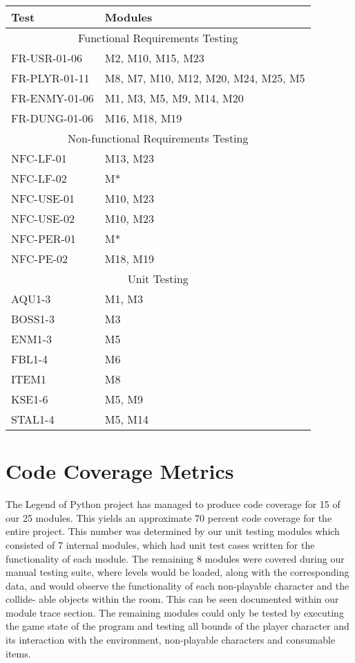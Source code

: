 \documentclass[12pt, titlepage]{article}
\begin{document}
\begin{tabular}{ll}
	\toprule
	Test & Modules \\
	\midrule
	\multicolumn{2}{c}{Functional Requirements Testing} \\
	\midrule
	FR-USR-01-06 & M2, M10, M15, M23 \\
	FR-PLYR-01-11 & M8, M7, M10, M12, M20, M24, M25, M5\\
	FR-ENMY-01-06 & M1, M3, M5, M9, M14, M20\\
	FR-DUNG-01-06 & M16, M18, M19\\
	\midrule
	\multicolumn{2}{c}{Non-functional Requirements Testing} \\
	\midrule
	NFC-LF-01 & M13, M23 \\
	NFC-LF-02 & M* \\
	NFC-USE-01 & M10, M23 \\
	NFC-USE-02 & M10, M23 \\
	NFC-PER-01 & M* \\
	NFC-PE-02 & M18, M19 \\
	\midrule
	\multicolumn{2}{c}{Unit Testing} \\
	\midrule
	AQU1-3 & M1, M3\\
	BOSS1-3 & M3\\ 
	ENM1-3 & M5\\
	FBL1-4 & M6\\
	ITEM1 & M8\\
	KSE1-6 & M5, M9\\
	STAL1-4 & M5, M14\\
	\bottomrule
\end{tabular}
	
	

\section{Code Coverage Metrics}
The Legend of Python project has managed to produce code coverage for 15 of our 25 modules. This yields an approximate 70 percent code coverage for the entire project. This number was determined by our unit testing modules which consisted of 7 internal modules, which had unit test cases written for the functionality of each module. The remaining 8 modules were covered during our manual testing suite, where levels would be loaded, along with the corresponding data, and would observe the functionality of each non-playable character and the collide- able objects within the room. This can be seen documented within our module trace section. The remaining modules could only be tested by executing the game state of the program and testing all bounds of the player character and its interaction with the environment, non-playable characters and consumable items.






\end{document}
